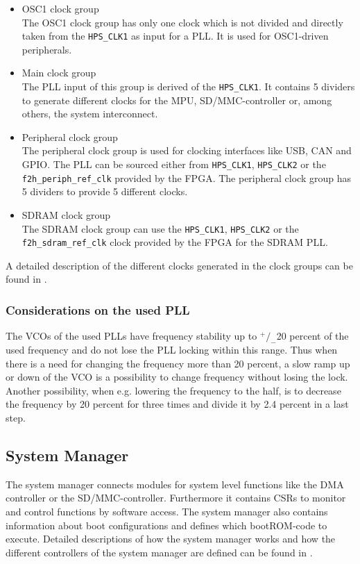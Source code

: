 \begin{itemize}
\item OSC1 clock group\\
The OSC1 clock group has only one clock which is not divided and directly taken from the \texttt{HPS\_CLK1} as input for a PLL. It is used for OSC1-driven peripherals.
\item Main clock group\\
The PLL input of this group is derived of the \texttt{HPS\_CLK1}. It contains 5 dividers to generate different clocks for the MPU, SD/MMC-controller or, among others, the system interconnect.
\item Peripheral clock group\\
The peripheral clock group is used for clocking interfaces like USB, CAN and GPIO. The PLL can be sourced either from \texttt{HPS\_CLK1}, \texttt{HPS\_CLK2} or the \texttt{f2h\_periph\_ref\_clk} provided by the FPGA. The peripheral clock group has 5 dividers to provide 5 different clocks.
\item SDRAM clock group\\
The SDRAM clock group can use the  \texttt{HPS\_CLK1}, \texttt{HPS\_CLK2} or the \texttt{f2h\_sdram\_ref\_clk} clock provided by the FPGA for the SDRAM PLL.
\end{itemize}
A detailed description of the different clocks generated in the clock groups can be found in \cite[chapter 2]{AlteraHPS15}.
\subsubsection{Considerations on the used PLL}
The VCOs of the used PLLs have frequency stability up to $\newcommand*\rfrac[2]{{}^{#1}\!/_{#2}}\rfrac{+}{-}$20 percent of the used frequency and do not lose the PLL locking within this range. Thus when there is a need for changing the frequency more than 20 percent, a slow ramp up or down of the VCO is a possibility to change frequency without losing the lock. Another possibility, when e.g. lowering the frequency to the half, is to decrease the frequency by 20 percent for three times and divide it by 2.4 percent in a last step.
\subsection{System Manager}
The system manager connects modules for system level functions like the DMA controller or the SD/MMC-controller. Furthermore it contains CSRs to monitor and control functions by software access. The system manager also contains information about boot configurations and defines which bootROM-code to execute. Detailed descriptions of how the system manager works and how the different controllers of the system manager are defined can be found in \cite[chapter 5]{AlteraHPS15}.
